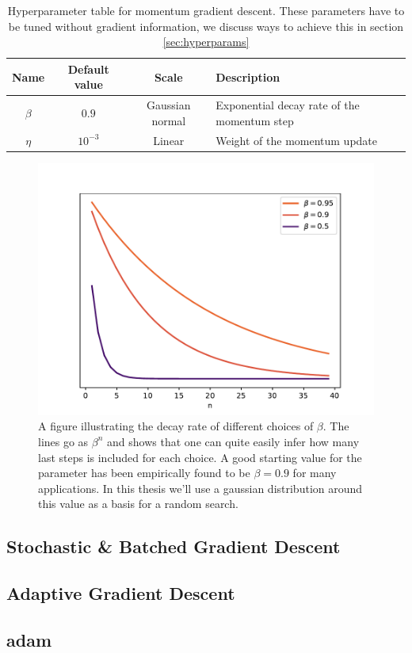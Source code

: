 \begin{table}
\begin{tabular}{c|c|c|l}
Name &Default value & Scale  & Description\\
\hline
$\beta$  & $0.9$ & Gaussian normal & Exponential decay rate of the momentum step\\
$\eta$  & $10^{-3}$ & Linear & Weight of the momentum update
\end{tabular}
\caption{Hyperparameter table for momentum gradient descent. These parameters have to be tuned without gradient information, we discuss ways to achieve this in section \ref{sec:hyperparams}}\label{tab:momentum}
\end{table}


\begin{figure}
\centering
\includegraphics{../figures/beta_decay.pdf}
\caption{A figure illustrating the decay rate of different choices of $\beta$. The lines go as $\beta^n$ and shows that one can quite easily infer how many last steps is included for each choice. A good starting value for the parameter has been empirically found to be $\beta=0.9$ for many applications. In this thesis we'll use a gaussian distribution around this value as a basis for a random search.}\label{fig:beta}
\end{figure}


\subsection{Stochastic \& Batched Gradient Descent}

\subsection{Adaptive Gradient Descent}
\subsection{adam}

